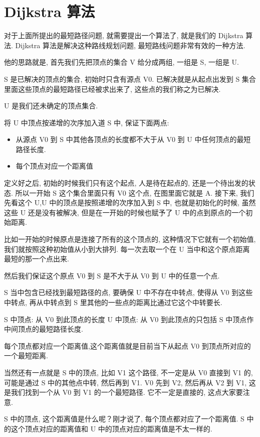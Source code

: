 \section{Dijkstra 算法}

对于上面所提出的最短路径问题, 就需要提出一个算法了, 就是我们的 Dijkstra 算法. Dijkstra 算法是解决这种路线规划问题, 最短路线问题非常有效的一种方法. 

他的思路就是, 首先我们先把顶点的集合 V 给分成两组, 一组是 S, 一组是 U. 

S 是已解决的顶点的集合, 初始时只含有源点 V0. 已解决就是从起点出发到 S 集合里面这些顶点的最短路径已经被求出来了, 这些点的我们称之为已解决. 

U 是我们还未确定的顶点集合. 

将 U 中顶点按递增的次序加入道 S 中, 保证下面两点: 

\begin{itemize}
  \item 从源点 V0 到 S 中其他各顶点的长度都不大于从 V0 到 U 中任何顶点的最短路径长度. 
  \item 每个顶点对应一个距离值
\end{itemize}

定义好之后, 初始的时候我们只有这个起点, 人是待在起点的, 还是一个待出发的状态. 所以一开始 S 这个集合里面只有 V0 这个点, 在图里面它就是 A. 接下来, 我们先看这个 U,U 中的顶点是按照递增的次序加入到 S 中, 也就是初始化的时候, 虽然这些 U 还是没有被解决, 但是在一开始的时候也赋予了 U 中的点到原点的一个初始距离. 

比如一开始的时候原点是连接了所有的这个顶点的, 这种情况下它就有一个初始值, 我们就按照这种初始值从小到大排列. 每一次去取一个在 U 当中和这个原点距离最短的那一个点出来. 

然后我们保证这个原点 V0 到 S 是不大于从 V0 到 U 中的任意一个点. 

S 当中包含已经找到最短路径的点, 要确保 U 中不存在中转点, 使得从 V0 到这些中转点, 再从中转点到 S 里其他的一些点的距离比通过它这个中转要长. 

S 中顶点: 从 V0 到此顶点的长度
U 中顶点: 从 V0 到此顶点的只包括 S 中顶点作中间顶点的最短路径长度. 

每个顶点都对应一个距离值,这个距离值就是目前当下从起点 V0 到顶点所对应的一个最短距离. 

当然还有一点就是 S 中的顶点, 比如 V1 这个路径, 不一定是从 V0 直接到 V1 的, 可能是通过 S 中的其他点中转, 然后再到 V1. V0 先到 V2, 然后再从 V2 到 V1, 这是我们找到一个从 V0 到 V1 的一个最短路径. 它不一定是直接的, 这点大家要注意. 

S 中的顶点, 这个距离值是什么呢？刚才说了, 每个顶点都对应了一个距离值. S 中的这个顶点对应的距离值和 U 中的顶点对应的距离值是不太一样的. 

